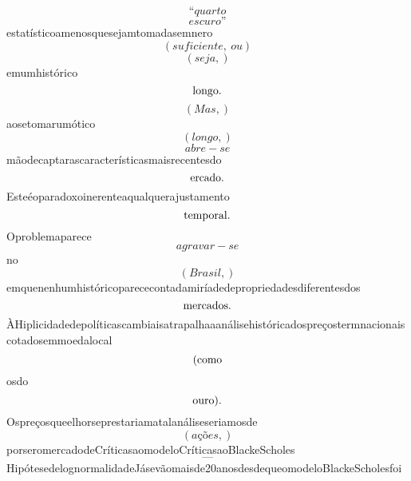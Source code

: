 \documentclass{article}
\begin{document}
\begin{equation}
“quarto
\end{equation}\begin{equation}
escuro”
\end{equation}estatísticoamenosquesejamtomadasemnero\begin{equation}
\left( suficiente, \  ou\right)
\end{equation}\begin{equation}
\left( seja,\right)
\end{equation}emumhistórico\begin{equation}
$longo.$
\end{equation}\begin{equation}
\left( Mas,\right)
\end{equation}aosetomarumótico\begin{equation}
\left( longo,\right)
\end{equation}\begin{equation}
abre - se
\end{equation}mãodecaptarascaracterísticasmaisrecentesdo\begin{equation}
$ercado.$
\end{equation}Esteéoparadoxoinerenteaqualquerajustamento\begin{equation}
$temporal.$
\end{equation}Oproblemaparece\begin{equation}
agravar - se
\end{equation}no\begin{equation}
\left( Brasil,\right)
\end{equation}emquenenhumhistóricoparececontadamiríadedepropriedadesdiferentesdos\begin{equation}
$mercados.$
\end{equation}ÀHiplicidadedepolíticascambiaisatrapalhaaanálisehistóricadospreçostermnacionaiscotadosemmoedalocal\begin{equation}
$(como$
\end{equation}osdo\begin{equation}
$ouro).$
\end{equation}Ospreçosqueelhorseprestariamatalanáliseseriamosde\begin{equation}
\left( ações,\right)
\end{equation}porseromercadodeCríticasaomodeloCríticasaoBlackeScholes\begin{equation}
—
\end{equation}HipótesedelognormalidadeJásevãomaisde20anosdesdequeomodeloBlackeScholesfoi\begin{equation}

\end{equation}
\end{document}
